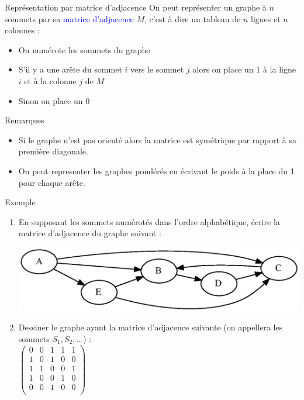 \documentclass[10pt]{beamer}
\begin{document}
\begin{frame}
	\mframe{\GR}
	\begin{alertblock}{Représentation par matrice d'adjacence}
		On peut représenter un graphe à $n$ sommets par sa \textcolor{blue}{matrice d'adjacence} $M$, c'est à dire un tableau de $n$ lignes et $n$ colonnes :
		\begin{itemize}
			\item<2-> On numérote les sommets du graphe
			\item<3-> S'il y a une arête du sommet $i$ vers le sommet $j$ alors on place un 1 à la ligne $i$ et à la colonne $j$ de $M$
			\item<4-> Sinon on place un 0
		\end{itemize}
	\end{alertblock}
	\begin{block}{Remarques}
		\begin{itemize}
			\item<5-> Si le graphe n'est pas orienté alors la matrice est symétrique par rapport à sa première diagonale.
			\item<6-> On peut representer les graphes pondérés en écrivant le poids à la place du 1 pour chaque arête.
		\end{itemize}
	\end{block}
\end{frame}

\begin{frame}
	\mframe{\GR}
	\begin{exampleblock}{Exemple}
		\begin{enumerate}
			\item<1-> En supposant les sommets numérotés dans l'ordre alphabétique, écrire la matrice d'adjacence du graphe suivant :
			      \begin{center}
				      \includegraphics[scale=0.5]{graph3.eps}
			      \end{center}
			\item<2-> Dessiner le graphe ayant la matrice d'adjacence suivante (on appellera les sommets $S_1, S_2, \dots $) :\\
			      $\begin{pmatrix}
					      0 & 0 & 1 & 1 & 1 \\
					      1 & 0 & 1 & 0 & 0 \\
					      1 & 1 & 0 & 0 & 1 \\
					      1 & 0 & 0 & 1 & 0 \\
					      0 & 0 & 1 & 0 & 0 \\
				      \end{pmatrix}$
		\end{enumerate}
	\end{exampleblock}
\end{frame}
\end{document}
